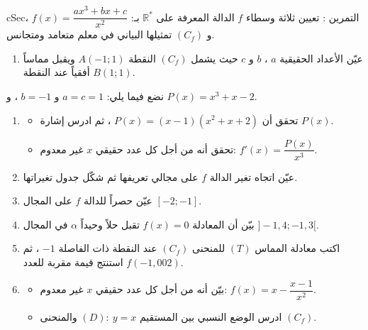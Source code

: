 \documentclass[12pt,a4paper]{article}
\newenvironment{BOX}[2]{\begin{otherlanguage}{english}\begin{arbox}{#1}{#2}}{\end{arbox}\end{otherlanguage}}
\newcounter{exo}
\newenvironment{tamrin}[1]{\stepcounter{exo}\begin{BOX}{cSec}{التمرين \theexo: #1}}{\end{BOX}}
\newcommand{\R}{\mathbb{R}}
\newenvironment{sq}{\begin{itemize}[leftmargin=2.4em,itemsep=3pt]}{\end{itemize}}
\newcommand{\qa}{\item[(أ)]}\newcommand{\qb}{\item[(ب)]}\newcommand{\qc}{\item[(جـ)]}\newcommand{\qd}{\item[(د)]}\newcommand{\qe}{\item[(هـ)]}
\begin{document}
\begin{tamrin}{تعيين ثلاثة وسطاء}
$f$ الدالة المعرفة على $\R^*$ بـ: $f(x)=\dfrac{ax^3+bx+c}{x^2}$ ، و $(C_f)$ تمثيلها البياني في معلم متعامد ومتجانس.
\begin{enumerate}
\item عيّن الأعداد الحقيقية $a$ ، $b$ و $c$ حيث يشمل $(C_f)$ النقطة $A(-1;1)$ ويقبل مماساً أفقياً عند النقطة $B(1;1)$.
\end{enumerate}
نضع فيما يلي: $a=c=1$ و $b=-1$ ، و $P(x)=x^3+x-2$.
\begin{enumerate}[resume]
\item
\begin{sq}
\qa تحقق أن $P(x)=(x-1)(x^2+x+2)$ ، ثم ادرس إشارة $P(x)$.
\qb تحقق أنه من أجل كل عدد حقيقي $x$ غير معدوم: $f'(x)=\dfrac{P(x)}{x^3}$.
\end{sq}
\item عيّن اتجاه تغير الدالة $f$ على مجالي تعريفها ثم شكّل جدول تغيراتها.
\item عيّن حصراً للدالة $f$ على المجال $[-2;-1]$.
\item بيّن أن المعادلة $f(x)=0$ تقبل حلاً وحيداً $\alpha$ في المجال $]-1{,}4;-1{,}3[$.
\item اكتب معادلة المماس $(T)$ للمنحنى $(C_f)$ عند النقطة ذات الفاصلة $-1$ ، ثم استنتج قيمة مقربة للعدد $f(-1{,}002)$.
\item
\begin{sq}
\qa بيّن أنه من أجل كل عدد حقيقي $x$ غير معدوم: $f(x)=x-\dfrac{x-1}{x^2}$.
\qb ادرس الوضع النسبي بين المستقيم $(D):\ y=x$ والمنحنى $(C_f)$.
\end{sq}
\end{enumerate}
\end{tamrin}
\end{document}
